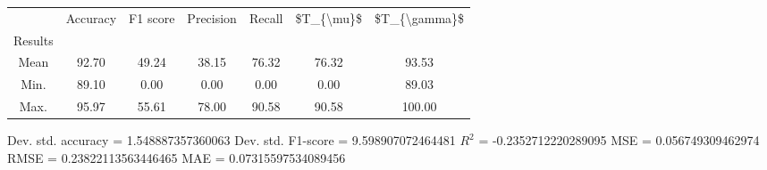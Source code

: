 \begin{tabular}{|c|c|c|c|c|c|c|}
\toprule
{} &  Accuracy &  F1 score &  Precision &  Recall &  \$T\_\{\textbackslash mu\}\$ &  \$T\_\{\textbackslash gamma\}\$ \\
Results &           &           &            &         &            &               \\
\hline
Mean    &     92.70 &     49.24 &      38.15 &   76.32 &      76.32 &         93.53 \\
Min.    &     89.10 &      0.00 &       0.00 &    0.00 &       0.00 &         89.03 \\
Max.    &     95.97 &     55.61 &      78.00 &   90.58 &      90.58 &        100.00 \\
\bottomrule
\end{tabular}

 Dev. std. accuracy = 1.548887357360063
 Dev. std. F1-score = 9.598907072464481
 $R^2$ = -0.2352712220289095
 MSE = 0.056749309462974
 RMSE = 0.23822113563446465
 MAE = 0.07315597534089456